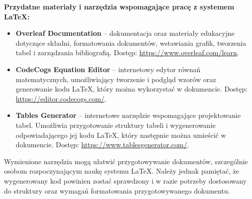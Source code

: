 \noindent
\textbf{Przydatne materiały i narzędzia wspomagające pracę z systemem \LaTeX{}:}

\begin{itemize}

    \item \textbf{Overleaf Documentation} --
    dokumentacja oraz materiały edukacyjne dotyczące składni,
    formatowania dokumentów, wstawiania grafik, tworzenia tabel
    i zarządzania bibliografią.
    Dostęp: \url{https://www.overleaf.com/learn}.

    \item \textbf{CodeCogs Equation Editor} --
    internetowy edytor równań matematycznych, umożliwiający
    tworzenie i podgląd wzorów oraz generowanie kodu \LaTeX{},
    który można wykorzystać w dokumencie.
    Dostęp: \url{https://editor.codecogs.com/}.

    \item \textbf{Tables Generator} --
    internetowe narzędzie wspomagające projektowanie tabel.
    Umożliwia przygotowanie struktury tabeli i wygenerowanie
    odpowiadającego jej kodu \LaTeX{}, który następnie można
    umieścić w dokumencie.
    Dostęp: \url{https://www.tablesgenerator.com/}.

\end{itemize}

Wymienione narzędzia mogą ułatwić przygotowywanie dokumentów,
szczególnie osobom rozpoczynającym naukę systemu \LaTeX{}.
Należy jednak pamiętać, że wygenerowany kod powinien zostać
sprawdzony i w razie potrzeby dostosowany do struktury
oraz wymagań formatowania przygotowywanego dokumentu.
